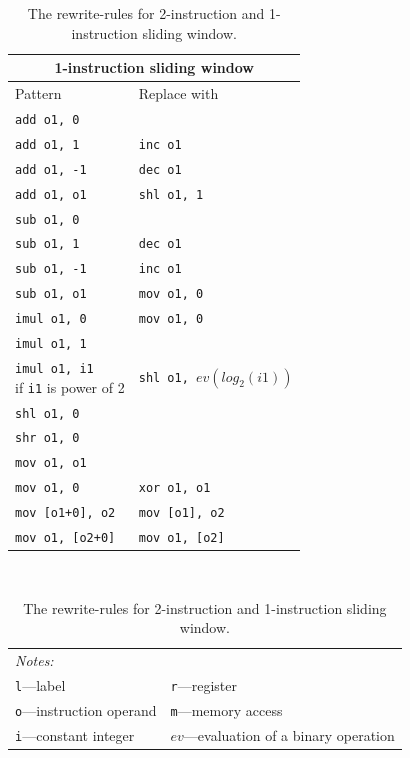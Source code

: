 \documentclass[thesis=M,english]{FITthesis}[2019/12/23]
\begin{document}
\begin{table}
\begin{minipage}{.55\linewidth}
    \begin{tabular}{|l|l|}
        \hline
        \multicolumn{2}{|c|}{1-instruction sliding window} \\
        \hline
        Pattern & Replace with\\
        \hline
        \hline
        \texttt{add o1, 0} &\\
        \hline
        \texttt{add o1, 1} & \texttt{inc o1}\\
        \hline
        \texttt{add o1, -1} & \texttt{dec o1}\\
        \hline
        \texttt{add o1, o1} & \texttt{shl o1, 1}\\
        \hline
        \texttt{sub o1, 0} &\\
        \hline
        \texttt{sub o1, 1} & \texttt{dec o1}\\
        \hline
        \texttt{sub o1, -1} & \texttt{inc o1}\\
        \hline
        \texttt{sub o1, o1} & \texttt{mov o1, 0}\\
        \hline
        \texttt{imul o1, 0} & \texttt{mov o1, 0}\\
        \hline
        \texttt{imul o1, 1} &\\
        \hline
        \makecell{ \texttt{imul o1, i1} \\ if \texttt{i1} is power of 2 } & \texttt{shl o1, }$ev(log_2(i1))$\\
        \hline
        \texttt{shl o1, 0} &\\
        \hline
        \texttt{shr o1, 0} &\\
        \hline
        \texttt{mov o1, o1} &\\
        \hline
        \texttt{mov o1, 0} & \texttt{xor o1, o1}\\
        \hline
        \texttt{mov [o1+0], o2} & \texttt{mov [o1], o2}\\
        \hline
        \texttt{mov o1, [o2+0]} & \texttt{mov o1, [o2]}\\
        \hline
    \end{tabular}
\end{minipage}%
\\
\begin{tabular}{ll}
    \multicolumn{2}{l}{\emph{Notes:}}\\
    \texttt{l}---label & \texttt{r}---register\\
    \texttt{o}---instruction operand & \texttt{m}---memory access\\
    \texttt{i}---constant integer & $ev$---evaluation of a binary operation\\
\end{tabular}
\caption{The rewrite-rules for 2-instruction and 1-instruction sliding window.}\label{tab:peephole_rules}
\end{table}
\end{document}
